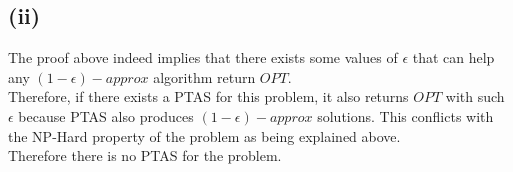 \subsection*{(ii)}

The proof above indeed implies that there exists some values of $\epsilon$ that can help any $(1-\epsilon)-approx$ algorithm return $OPT$.\\

Therefore, if there exists a PTAS for this problem, it also returns $OPT$ with such $\epsilon$ because PTAS also produces $(1-\epsilon)-approx$ solutions. This conflicts with the NP-Hard property of the problem as being explained above.\\

Therefore there is no PTAS for the problem.


	

